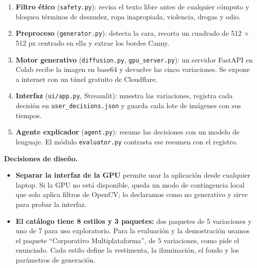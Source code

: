 \documentclass[conference]{IEEEtran}
\begin{document}
\begin{enumerate}
\item \textbf{Filtro ético} (\texttt{safety.py}): revisa el texto libre antes de cualquier cómputo y bloquea términos de desnudez, ropa inapropiada, violencia, drogas y odio.
\item \textbf{Preproceso} (\texttt{generator.py}): detecta la cara, recorta un cuadrado de 512 × 512 px centrado en ella y extrae los bordes Canny.
\item \textbf{Motor generativo} (\texttt{diffusion.py}, \texttt{gpu\_server.py}): un servidor FastAPI en Colab recibe la imagen en base64 y devuelve las cinco variaciones. Se expone a internet con un túnel gratuito de Cloudflare.
\item \textbf{Interfaz} (\texttt{ui/app.py}, Streamlit): muestra las variaciones, registra cada decisión en \texttt{user\_decisions.json} y guarda cada lote de imágenes con sus tiempos.
\item \textbf{Agente explicador} (\texttt{agent.py}): resume las decisiones con un modelo de lenguaje. El módulo \texttt{evaluator.py} contrasta ese resumen con el registro.
\end{enumerate}

\textbf{Decisiones de diseño.}

\begin{itemize}
\item \textbf{Separar la interfaz de la GPU} permite usar la aplicación desde cualquier laptop. Si la GPU no está disponible, queda un modo de contingencia local que solo aplica filtros de OpenCV; lo declaramos como no generativo y sirve para probar la interfaz.
\item \textbf{El catálogo tiene 8 estilos y 3 paquetes:} dos paquetes de 5 variaciones y uno de 7 para uso exploratorio. Para la evaluación y la demostración usamos el paquete ``Corporativo Multiplataforma'', de 5 variaciones, como pide el enunciado. Cada estilo define la vestimenta, la iluminación, el fondo y los parámetros de generación.
\end{itemize}
\end{document}
